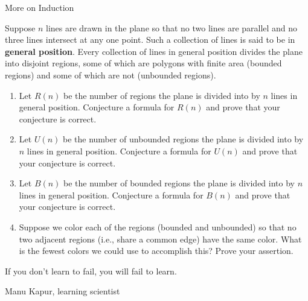 \begin{section}{More on Induction}
\begin{problem}
Suppose $n$ lines are drawn in the plane so that no two lines are parallel and no three lines intersect at any one point. Such a collection of lines is said to be in \textbf{general position}. Every collection of lines in general position divides the plane into disjoint regions, some of which are polygons with finite area (bounded regions) and some of which are not (unbounded regions).
\begin{enumerate}[label=\textrm{(\alph*)}]
\item Let $R(n)$ be the number of regions the plane is divided into by $n$ lines in general position.  Conjecture a formula for $R(n)$ and prove that your conjecture is correct.
\item Let $U(n)$ be the number of unbounded regions the plane is divided into by $n$ lines in general position.  Conjecture a formula for $U(n)$ and prove that your conjecture is correct.
\item Let $B(n)$ be the number of bounded regions the plane is divided into by $n$ lines in general position.  Conjecture a formula for $B(n)$ and prove that your conjecture is correct.
\item Suppose we color each of the regions (bounded and unbounded) so that no two adjacent regions (i.e., share a common edge) have the same color.  What is the fewest colors we could use to accomplish this?  Prove your assertion.
\end{enumerate}
\end{problem} 

\epigraph{If you don't learn to fail, you will fail to learn.}{Manu Kapur, learning scientist}

\end{section}